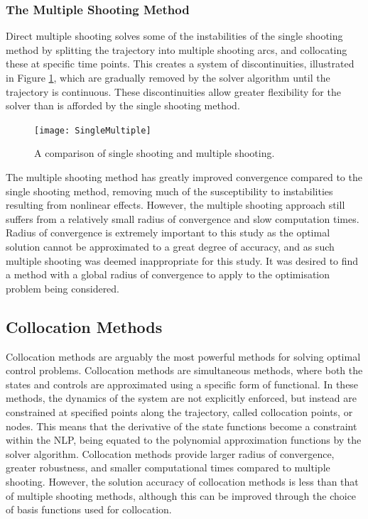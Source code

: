 
\subsubsection{The Multiple Shooting Method}

Direct multiple shooting solves some of the instabilities of the single shooting method by splitting the trajectory into multiple shooting arcs, and collocating these at specific time points\cite{Betts1998,Kelly2015,Rao2009,Fasano2013}. This creates a system of discontinuities, illustrated in Figure \ref{fig:multipleshooting}, which are gradually removed by the solver algorithm until the trajectory is continuous. These discontinuities allow greater flexibility for the solver than is afforded by the single shooting method. 

\begin{figure}[ht]
	\centering
	\texttt{[image: SingleMultiple]}
	\caption{A comparison of single shooting and multiple shooting\cite{Kelly2015}.}
	\label{fig:multipleshooting}
\end{figure}

The multiple shooting method has greatly improved convergence compared to the single shooting method, removing much of the susceptibility to instabilities resulting from nonlinear effects. However, the multiple shooting approach still suffers from a relatively small radius of convergence and slow computation times. Radius of convergence is extremely important to this study as the optimal solution cannot be approximated to a great degree of accuracy, and as such multiple shooting was deemed inappropriate for this study. It was desired to find a method with a global radius of convergence to apply to the optimisation problem being considered.

\subsection{Collocation Methods}

Collocation methods are arguably the most powerful methods for solving optimal control problems\cite{Rao2009}. Collocation methods are simultaneous methods, where both the states and controls are approximated using a specific form of functional\cite{Kelly2015,Rao2009}. In these methods, the dynamics of the system are not explicitly enforced, but instead are constrained at specified points along the trajectory, called collocation points, or nodes\cite{Kelly2015}. This means that the derivative of the state functions become a constraint within the NLP, being equated to the polynomial approximation functions by the solver algorithm. 
Collocation methods provide larger radius of convergence, greater robustness, and smaller computational times compared to multiple shooting\cite{Fasano2013}. However, the solution accuracy of collocation methods is less than that of multiple shooting methods\cite{Fasano2013}, although this can be improved through the choice of basis functions used for collocation\cite{Rao2009}.

